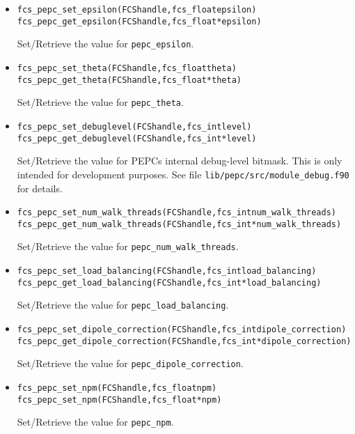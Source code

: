 \begin{itemize}

\item
  \begin{alltt}
    fcs_pepc_set_epsilon(FCS handle, fcs_float epsilon)
    fcs_pepc_get_epsilon(FCS handle, fcs_float* epsilon)
  \end{alltt}
  Set/Retrieve the value for \texttt{pepc\_epsilon}.

\item
  \begin{alltt}
    fcs_pepc_set_theta(FCS handle, fcs_float theta)
    fcs_pepc_get_theta(FCS handle, fcs_float* theta)
  \end{alltt}
  Set/Retrieve the value for \texttt{pepc\_theta}.

\item
  \begin{alltt}
    fcs_pepc_set_debuglevel(FCS handle, fcs_int level)
    fcs_pepc_get_debuglevel(FCS handle, fcs_int* level)
  \end{alltt}
  Set/Retrieve the value for PEPCs internal debug-level bitmask.
  This is only intended for development purposes. 
  See file \texttt{lib/pepc/src/module\_debug.f90} for details.

\item
  \begin{alltt}
    fcs_pepc_set_num_walk_threads(FCS handle, fcs_int num_walk_threads)
    fcs_pepc_get_num_walk_threads(FCS handle, fcs_int* num_walk_threads)
  \end{alltt}
  Set/Retrieve the value for \texttt{pepc\_num\_walk\_threads}.

\item
  \begin{alltt}
    fcs_pepc_set_load_balancing(FCS handle, fcs_int load_balancing)
    fcs_pepc_get_load_balancing(FCS handle, fcs_int* load_balancing)
  \end{alltt}
  Set/Retrieve the value for \texttt{pepc\_load\_balancing}.

\item
  \begin{alltt}
    fcs_pepc_set_dipole_correction(FCS handle, fcs_int dipole_correction)
    fcs_pepc_get_dipole_correction(FCS handle, fcs_int* dipole_correction)
  \end{alltt}
  Set/Retrieve the value for \texttt{pepc\_dipole\_correction}.

\item
  \begin{alltt}
    fcs_pepc_set_npm(FCS handle, fcs_float npm)
    fcs_pepc_set_npm(FCS handle, fcs_float* npm)
  \end{alltt}
  Set/Retrieve the value for \texttt{pepc\_npm}.
  
\end{itemize}


